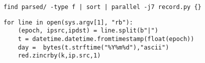 
\begin{lstlisting}
find parsed/ -type f | sort | parallel -j7 record.py {}
\end{lstlisting}

\begin{lstlisting}
for line in open(sys.argv[1], "rb"):
    (epoch, ipsrc,ipdst) = line.split(b"|")
    t = datetime.datetime.fromtimestamp(float(epoch))
    day =  bytes(t.strftime("%Y%m%d"),"ascii")
    red.zincrby(k,ip.src,1)
\end{lstlisting}
